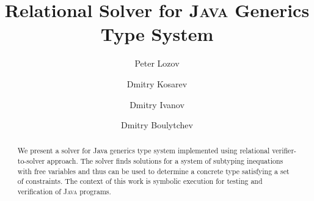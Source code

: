 \documentclass[runningheads]{llncs}
\begin{document}
%
\title{Relational Solver for \textsc{Java} Generics Type System}
%
%
\author{
  Peter Lozov \and
  Dmitry Kosarev \and
  Dmitry Ivanov\and
  Dmitry Boulytchev
}
%
%
%
\maketitle              %
%
\begin{abstract}
  We present a solver for Java generics type system implemented using relational verifier-to-solver
  approach. The solver finds solutions for a system of subtyping inequations with free variables
  and thus can be used to determine a concrete type satisfying a set of constraints. The
  context of this work is symbolic execution for testing and verification of \textsc{Java} programs.
\end{abstract}
%
%
%








%
%
%


%
\end{document}
